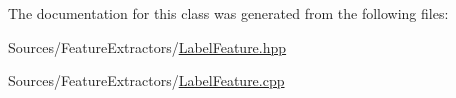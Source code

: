 The documentation for this class was generated from the following files\+:\begin{DoxyCompactItemize}
\item 
Sources/\+Feature\+Extractors/\hyperlink{_label_feature_8hpp}{Label\+Feature.\+hpp}\item 
Sources/\+Feature\+Extractors/\hyperlink{_label_feature_8cpp}{Label\+Feature.\+cpp}\end{DoxyCompactItemize}
